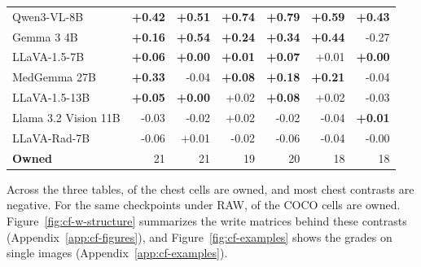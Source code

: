 \documentclass[11pt]{article}
\begin{document}
\begin{table}[t]
{\begin{tabular}{lrrrrrr}
Qwen3-VL-8B & \cellcolor{cfTerra4}\textbf{+0.42} & \cellcolor{cfTerra4}\textbf{+0.51} & \cellcolor{cfTerra4}\textbf{+0.74} & \cellcolor{cfTerra4}\textbf{+0.79} & \cellcolor{cfTerra4}\textbf{+0.59} & \cellcolor{cfTerra4}\textbf{+0.43} \\
Gemma 3 4B & \cellcolor{cfTerra3}\textbf{+0.16} & \cellcolor{cfTerra4}\textbf{+0.54} & \cellcolor{cfTerra3}\textbf{+0.24} & \cellcolor{cfTerra4}\textbf{+0.34} & \cellcolor{cfTerra4}\textbf{+0.44} & \cellcolor{cfSlate4}-0.27 \\
LLaVA-1.5-7B & \cellcolor{cfTerra2}\textbf{+0.06} & \cellcolor{cfTerra1}\textbf{+0.00} & \cellcolor{cfTerra1}\textbf{+0.01} & \cellcolor{cfTerra2}\textbf{+0.07} & \cellcolor{cfTerra1}+0.01 & \cellcolor{cfTerra1}\textbf{+0.00} \\
MedGemma 27B & \cellcolor{cfTerra4}\textbf{+0.33} & \cellcolor{cfSlate2}-0.04 & \cellcolor{cfTerra2}\textbf{+0.08} & \cellcolor{cfTerra3}\textbf{+0.18} & \cellcolor{cfTerra3}\textbf{+0.21} & \cellcolor{cfSlate2}-0.04 \\
LLaVA-1.5-13B & \cellcolor{cfTerra2}\textbf{+0.05} & \cellcolor{cfTerra1}\textbf{+0.00} & \cellcolor{cfTerra1}+0.02 & \cellcolor{cfTerra2}\textbf{+0.08} & \cellcolor{cfTerra1}+0.02 & \cellcolor{cfSlate2}-0.03 \\
Llama 3.2 Vision 11B & \cellcolor{cfSlate2}-0.03 & \cellcolor{cfSlate2}-0.02 & \cellcolor{cfTerra2}+0.02 & \cellcolor{cfSlate1}-0.02 & \cellcolor{cfSlate2}-0.04 & \cellcolor{cfTerra1}\textbf{+0.01} \\
LLaVA-Rad-7B & \cellcolor{cfSlate2}-0.06 & \cellcolor{cfTerra1}+0.01 & \cellcolor{cfSlate2}-0.02 & \cellcolor{cfSlate2}-0.06 & \cellcolor{cfSlate2}-0.04 & \cellcolor{cfSlate1}-0.00 \\
\midrule
\textbf{Owned} & 21 & 21 & 19 & 20 & 18 & 18 \\
\bottomrule
\end{tabular}}
\end{table}



Across the three tables, \cfChestOwned{} of the \cfChestCellsN{} chest cells are owned, and most chest contrasts are negative. For the same checkpoints under RAW, \cfCocoOwned{} of the \cfCocoOwnedN{} COCO cells are owned. Figure~\ref{fig:cf-w-structure} summarizes the write matrices behind these contrasts (Appendix~\ref{app:cf-figures}), and Figure~\ref{fig:cf-examples} shows the grades on single images (Appendix~\ref{app:cf-examples}).
\end{document}
